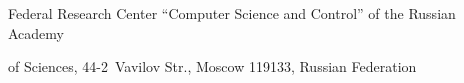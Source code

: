 \titel{\tit}{\aut}{\autkol}{\titkol}





\vspace*{-8pt}





\noindent


Federal Research Center ``Computer Science and Control'' of the Russian Academy


of Sciences,   44-2~Vavilov Str., Moscow 119133, Russian Federation








\def\leftfootline{\small{\textbf{\thepage}


\hfill Sistemy i Sredstva Informatiki~---


Systems and Means of Informatics 2023 vol~33 no\,4}


}%


 \def\rightfootline{\small{Sistemy i Sredstva Informatiki~---


 Systems and Means of Informatics 2023 vol~33 no\,4


\hfill \textbf{\thepage}}}
















